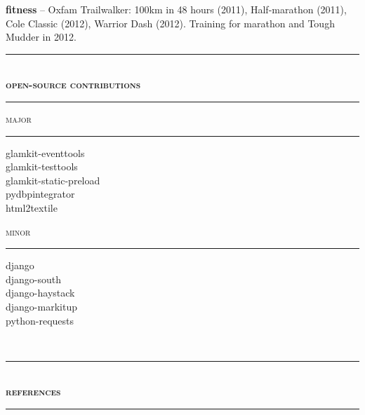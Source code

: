 \documentclass[a4paper,12pt]{article}
\begin{document}
\begin{spacing}{0.95}
\begin{minipage}[t]{95.5mm}
{	\vspace{3mm}
	\textbf{\textsf{\color{grey}fitness}} -- Oxfam Trailwalker{\condensed :} 100km in 48 hours (2011), Half-marathon (2011), Cole Classic (2012), Warrior Dash (2012). Training for marathon and Tough Mudder in 2012.%
	}%
	
	\vspace{2.25mm}
	\rule[1mm]{\linewidth}{1mm}\\
	{\Large\textsc{\textbf{open-source contributions}}}\\
	\vspace{1mm}%
	\rule[1mm]{\linewidth}{1mm}
	
	\begin{minipage}[t]{45.25mm}
		{\large\textsc{major}}\\
		\vspace{-3.1mm}%
		\rule[3mm]{\linewidth}{0.25mm}
				
		{\small
		glamkit-eventtools\\
		glamkit-testtools\\
		glamkit-static-preload\\
		pydbpintegrator\\
		html2textile}
	\end{minipage}%
	\hspace{5mm}%
	\begin{minipage}[t]{45.25mm}
		{\large\textsc{minor}}\\
		\vspace{-3.1mm}%
		\rule[3mm]{\linewidth}{0.25mm}
		
		{\small
		django\\
		django-south\\
		django-haystack\\
		django-markitup\\
		python-requests}
	\end{minipage}
\end{minipage}\\
\vspace{1mm}

\rule[1mm]{\linewidth}{1mm}\\
{\Large\textsc{\textbf{references}}}\\
\rule[1mm]{\linewidth}{1mm}


\end{spacing}
\end{document}
